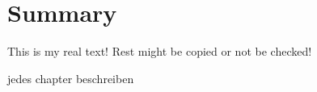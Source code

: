 \section{Summary}\label{section:conclusion-summary}
This is my real text! Rest might be copied or not be checked!

jedes chapter beschreiben
